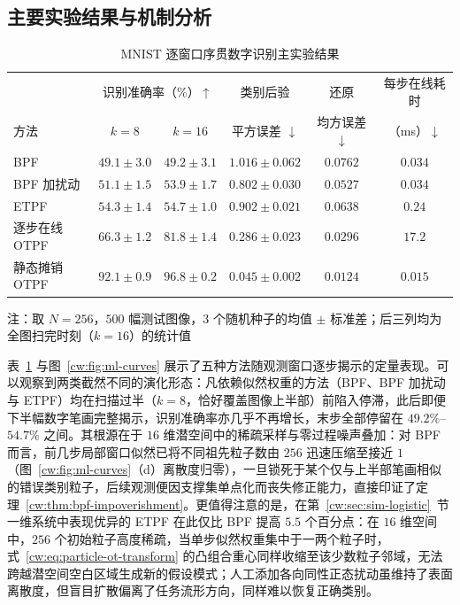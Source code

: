 \subsection{主要实验结果与机制分析}

\begin{table}[!htb]
\centering
\caption{MNIST 逐窗口序贯数字识别主实验结果}
\label{cw:tab:ml-main}
\vspace{0.5em}\wuhao\setlength{\tabcolsep}{5pt}
\begin{tabular}{lccccc}
\toprule[1.5pt]
 & \multicolumn{2}{c}{识别准确率（\%）$\uparrow$} & 类别后验 & 还原 & 每步在线耗时 \\
方法 & $k=8$ & $k=16$ & 平方误差 $\downarrow$ & 均方误差 $\downarrow$ & （ms）$\downarrow$ \\
\midrule[1pt]
BPF & $49.1\pm3.0$ & $49.2\pm3.1$ & $1.016\pm0.062$ & $0.0762$ & $0.034$ \\
BPF 加扰动 & $51.1\pm1.5$ & $53.9\pm1.7$ & $0.802\pm0.030$ & $0.0527$ & $0.034$ \\
ETPF & $54.3\pm1.4$ & $54.7\pm1.0$ & $0.902\pm0.021$ & $0.0638$ & $0.24$ \\
逐步在线 OTPF & $66.3\pm1.2$ & $81.8\pm1.4$ & $0.286\pm0.023$ & $0.0296$ & $17.2$ \\
静态摊销 OTPF & $\mathbf{92.1}\pm0.9$ & $\mathbf{96.8}\pm0.2$ & $\mathbf{0.045}\pm0.002$ & $\mathbf{0.0124}$ & $\mathbf{0.015}$ \\
\bottomrule[1.5pt]
\end{tabular}
\par\vspace{3pt}
{\wuhao 注：取 $N=256$，$500$ 幅测试图像，$3$ 个随机种子的均值 $\pm$ 标准差；后三列均为全图扫完时刻（$k=16$）的统计值\par}
\end{table}

表~\ref{cw:tab:ml-main} 与图~\ref{cw:fig:ml-curves} 展示了五种方法随观测窗口逐步揭示的定量表现。可以观察到两类截然不同的演化形态：凡依赖似然权重的方法（BPF、BPF 加扰动与 ETPF）均在扫描过半（$k=8$，恰好覆盖图像上半部）前陷入停滞，此后即便下半幅数字笔画完整揭示，识别准确率亦几乎不再增长，末步全部停留在 $49.2\%$--$54.7\%$ 之间。其根源在于 $16$ 维潜空间中的稀疏采样与零过程噪声叠加：对 BPF 而言，前几步局部窗口似然已将不同祖先粒子数由 $256$ 迅速压缩至接近 $1$（图~\ref{cw:fig:ml-curves}（d）离散度归零），一旦锁死于某个仅与上半部笔画相似的错误类别粒子，后续观测便因支撑集单点化而丧失修正能力，直接印证了定理~\ref{cw:thm:bpf-impoverishment}。更值得注意的是，在第~\ref{cw:sec:sim-logistic}~节一维系统中表现优异的 ETPF 在此仅比 BPF 提高 $5.5$ 个百分点：在 $16$ 维空间中，$256$ 个初始粒子高度稀疏，当单步似然权重集中于一两个粒子时，式~\eqref{cw:eq:particle-ot-transform} 的凸组合重心同样收缩至该少数粒子邻域，无法跨越潜空间空白区域生成新的假设模式；人工添加各向同性正态扰动虽维持了表面离散度，但盲目扩散偏离了任务流形方向，同样难以恢复正确类别。


